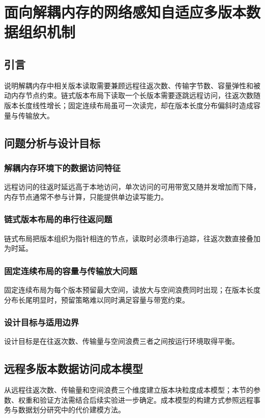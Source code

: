 \chapter{面向解耦内存的网络感知自适应多版本数据组织机制}

\section{引言}
说明解耦内存中相关版本读取需要兼顾远程往返次数、传输字节数、容量弹性和被动内存节点约束。链式版本布局下读取一个长版本需要逐跳远程访问，往返次数随版本长度线性增长\cite{zhangMotor2024}；固定连续布局虽可一次读完，却在版本长度分布偏斜时造成容量与传输放大\cite{binnigEnd2016,zhangMotor2024}。
\section{问题分析与设计目标}
\subsection{解耦内存环境下的数据访问特征}
远程访问的往返时延远高于本地访问，单次访问的可用带宽又随并发增加而下降\cite{binnigEnd2016,zamanianEnd2017}，内存节点通常不参与计算，只能提供单边读写能力\cite{weiCharacterizing2021,caiEfficient2018}。
\subsection{链式版本布局的串行往返问题}
链式布局把版本组织为指针相连的节点，读取时必须串行追踪，往返次数直接叠加为时延\cite{zhangMotor2024,tuSpeedy2013}。
\subsection{固定连续布局的容量与传输放大问题}
固定连续布局为每个版本预留最大空间，读放大与空间浪费同时出现\cite{zhangMotor2024}；在版本长度分布长尾明显时，预留策略难以同时满足容量与带宽约束\cite{caiEfficient2018}。
\subsection{设计目标与适用边界}
设计目标是在往返次数、传输量与空间浪费三者之间按运行环境取得平衡\cite{binnigEnd2016,zamanianChiller2020}。

\section{远程多版本数据访问成本模型}
从远程往返次数、传输量和空间浪费三个维度建立版本块粒度成本模型；本节的参数、权重和验证方法需结合后续实验进一步确定。成本模型的构建方式参照远程事务与数据划分研究中的代价建模方法\cite{zamanianChiller2020,binnigEnd2016}。
